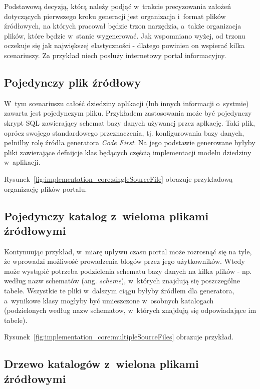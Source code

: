 Podstawową decyzją, którą należy podjąć w~trakcie precyzowania założeń dotyczących pierwszego kroku generacji jest organizacja i~format plików źródłowych, na których pracował będzie trzon narzędzia, a~także organizacja plików, które będzie w~stanie wygenerować.
Jak wspomniano wyżej, od trzonu oczekuje się jak największej elastyczności - dlatego powinien on wspierać kilka scenariuszy.
Za przykład niech posłuży internetowy portal informacyjny.


\subsection{Pojedynczy plik źródłowy}

W~tym scenariuszu całość dziedziny aplikacji (lub innych informacji o~systmie) zawarta jest pojedynczym pliku.
Przykładem zastosowania może być pojedynczy skrypt SQL zawierający schemat bazy danych używanej przez aplkację.
Taki plik, oprócz swojego standardowego przeznaczenia, tj. konfigurowania bazy danych, pełniłby rolę źródła generatora \emph{Code First}.
Na jego podstawie generowane byłyby pliki zawierające defnijcje klas będących częścią implementacji modelu dziedziny w~aplikacji.

Rysunek~\ref{fig:implementation_core:singleSourceFile} obrazuje przykładową organizację plików portalu.




\subsection{Pojedynczy katalog z~wieloma plikami źródłowymi}

Kontynuując przykład, w~miarę upływu czasu portal może rozrosnąć się na tyle, że wprowadzi możliwość prowadzenia blogów przez jego użytkowników.
Wtedy może wystąpić potrzeba podzielenia schematu bazy danych na kilka plików - np. według nazw schematów (ang. \emph{scheme}), w~których znajdują się poszczególne tabele.
Wszystkie te pliki w~dalszym ciągu byłyby źródłem dla generatora, a~wynikowe klasy mogłyby być umieszczone w~osobnych katalogach (podzielonych według nazw schematow, w~których znajdują się odpowiadające im tabele).

Rysunek~\ref{fig:implementation_core:multipleSourceFiles} obrazuje przykład.




\subsection{Drzewo katalogów z~wielona plikami źródłowymi} \label{sec:core:files_structure:many_folders}

